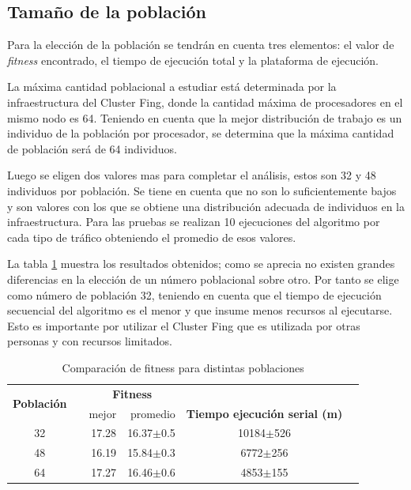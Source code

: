 \subsection{Tamaño de la población}

Para la elección de la población se tendrán en cuenta tres elementos: el valor de \emph{fitness} encontrado, el tiempo de ejecución total y la plataforma de ejecución.

La máxima cantidad poblacional a estudiar está determinada por la infraestructura del Cluster Fing, donde la cantidad máxima de procesadores en el mismo nodo es 64. Teniendo en cuenta que la mejor distribución de trabajo es un individuo de la población por procesador, se determina que la máxima cantidad de población será de 64 individuos.

Luego se eligen dos valores mas para completar el análisis, estos son 32 y 48 individuos por población. Se tiene en cuenta que no son lo suficientemente bajos y son valores con los que se obtiene una distribución adecuada de individuos en la infraestructura. Para las pruebas se realizan 10 ejecuciones del algoritmo por cada tipo de tráfico obteniendo el promedio de esos valores.

La tabla \ref{table:parametro_poblacion} muestra los resultados obtenidos; como se aprecia no existen grandes diferencias en la elección de un número poblacional sobre otro. Por tanto se elige como número de población 32, teniendo en cuenta que el tiempo de ejecución secuencial del algoritmo es el menor y que insume menos recursos al ejecutarse. Esto es importante por utilizar el Cluster Fing que es utilizada por otras personas y con recursos limitados.

\begin{table}[h]
	\renewcommand{\arraystretch}{1.2}
	\caption{Comparación de fitness para distintas poblaciones}
	\label{table:parametro_poblacion}
	\centering
	\begin{tabular}{ccrrcp{2cm}}
		\hline
	    \multirow{2}{*}{\textbf{Población}}& & 
		\multicolumn{2}{c}{\textbf{Fitness}} \\
		\cline{3-4}
		& & {mejor} 
		& {promedio} 
		& \textbf{Tiempo ejecución serial (m)} \\
		\hline
		32 & & {17.28} & 16.37$\pm$0.5 & 10184$\pm$526\\
		48 & & {16.19} & 15.84$\pm$0.3 & 6772$\pm$256\\
		64 & & {17.27} & 16.46$\pm$0.6 & 4853$\pm$155\\
		\hline
	\end{tabular}
\end{table}





